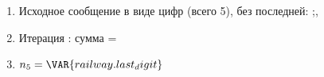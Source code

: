 \begin{enumerate}
\item Исходное сообщение в виде цифр (всего 5), без последней:
;,

\item Итерация : сумма = 

\item $n_5 = \VAR{railway.last_digit}$
\end{enumerate}